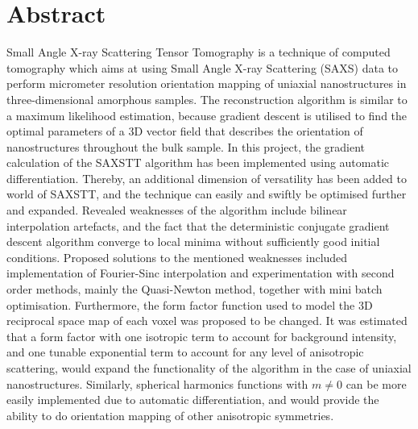 


\begingroup
\let\clearpage\relax
\let\cleardoublepage\relax
\let\cleardoublepage\relax

\chapter*{Abstract}

Small Angle X-ray Scattering Tensor Tomography is a technique of computed tomography
which aims at using Small Angle X-ray Scattering (SAXS) data to perform micrometer resolution orientation mapping
of uniaxial nanostructures in three-dimensional amorphous samples.
The reconstruction algorithm is similar to a maximum likelihood estimation, because gradient descent is utilised to find the optimal parameters of a 3D vector field
that describes the orientation of nanostructures throughout the bulk sample.
In this project, the gradient calculation of the SAXSTT algorithm has been implemented using automatic differentiation.
Thereby, an additional dimension of versatility has been added to world of SAXSTT, and the technique can easily and swiftly be optimised further and expanded.
Revealed weaknesses of the algorithm include bilinear interpolation artefacts,
and the fact that the deterministic conjugate gradient descent algorithm converge to local minima without sufficiently good initial conditions.
Proposed solutions to the mentioned weaknesses included implementation of Fourier-Sinc interpolation and experimentation with second order methods, mainly the Quasi-Newton method, together with mini batch optimisation.
Furthermore, the form factor function used to model the 3D reciprocal space map of each voxel was proposed to be changed.
It was estimated that a form factor with one isotropic term to account for background intensity,
and one tunable exponential term to account for any level of anisotropic scattering, would expand the functionality of the algorithm in the case of uniaxial nanostructures.
\noindent
Similarly, spherical harmonics functions with $m \neq 0$ can be more easily implemented due to automatic differentiation,
and would provide the ability to do orientation mapping of other anisotropic symmetries.


